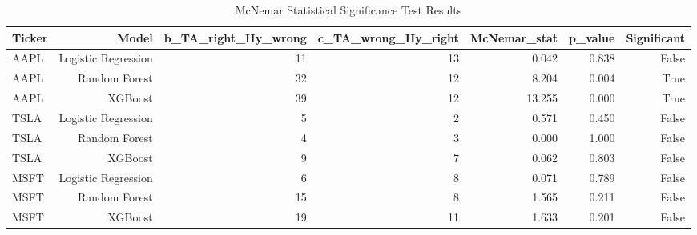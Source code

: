 \begin{table}[h]
\centering
\caption{McNemar Statistical Significance Test Results}
\label{tab:mcnemar}
\begin{tabular}{lrrrrrr}
\hline
Ticker & Model & b_TA_right_Hy_wrong & c_TA_wrong_Hy_right & McNemar_stat & p_value & Significant \\
\hline
AAPL & Logistic Regression & 11 & 13 & 0.042 & 0.838 & False \\
AAPL & Random Forest & 32 & 12 & 8.204 & 0.004 & True \\
AAPL & XGBoost & 39 & 12 & 13.255 & 0.000 & True \\
TSLA & Logistic Regression & 5 & 2 & 0.571 & 0.450 & False \\
TSLA & Random Forest & 4 & 3 & 0.000 & 1.000 & False \\
TSLA & XGBoost & 9 & 7 & 0.062 & 0.803 & False \\
MSFT & Logistic Regression & 6 & 8 & 0.071 & 0.789 & False \\
MSFT & Random Forest & 15 & 8 & 1.565 & 0.211 & False \\
MSFT & XGBoost & 19 & 11 & 1.633 & 0.201 & False \\
\hline
\end{tabular}
\end{table}